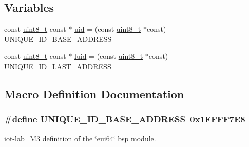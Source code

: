 \subsection*{Variables}
\begin{DoxyCompactItemize}
\item 
const \hyperlink{_p_e___types_8h_aba7bc1797add20fe3efdf37ced1182c5}{uint8\+\_\+t} const $\ast$ \hyperlink{iot-lab___m3_2eui64_8c_a39099710e729efb534067f3d36d7f21f}{uid} = (const \hyperlink{_p_e___types_8h_aba7bc1797add20fe3efdf37ced1182c5}{uint8\+\_\+t} $\ast$const) \hyperlink{iot-lab___m3_2eui64_8c_a13ace2b7d86e7d30c89c7b1fa720859a}{U\+N\+I\+Q\+U\+E\+\_\+\+I\+D\+\_\+\+B\+A\+S\+E\+\_\+\+A\+D\+D\+R\+E\+SS}
\item 
const \hyperlink{_p_e___types_8h_aba7bc1797add20fe3efdf37ced1182c5}{uint8\+\_\+t} const $\ast$ \hyperlink{iot-lab___m3_2eui64_8c_abb80a3bafe316fa88843c9124c8c5783}{luid} = (const \hyperlink{_p_e___types_8h_aba7bc1797add20fe3efdf37ced1182c5}{uint8\+\_\+t} $\ast$const) \hyperlink{iot-lab___m3_2eui64_8c_ab59ec9c178356b200db5d5f90253b1b9}{U\+N\+I\+Q\+U\+E\+\_\+\+I\+D\+\_\+\+L\+A\+S\+T\+\_\+\+A\+D\+D\+R\+E\+SS}
\end{DoxyCompactItemize}


\subsection{Macro Definition Documentation}
\subsubsection[{\texorpdfstring{U\+N\+I\+Q\+U\+E\+\_\+\+I\+D\+\_\+\+B\+A\+S\+E\+\_\+\+A\+D\+D\+R\+E\+SS}{UNIQUE_ID_BASE_ADDRESS}}]{\setlength{\rightskip}{0pt plus 5cm}\#define U\+N\+I\+Q\+U\+E\+\_\+\+I\+D\+\_\+\+B\+A\+S\+E\+\_\+\+A\+D\+D\+R\+E\+SS~0x1\+F\+F\+F\+F7\+E8}\hypertarget{iot-lab___m3_2eui64_8c_a13ace2b7d86e7d30c89c7b1fa720859a}{}\label{iot-lab___m3_2eui64_8c_a13ace2b7d86e7d30c89c7b1fa720859a}


iot-\/lab\+\_\+\+M3 definition of the \char`\"{}eui64\char`\"{} bsp module. 

